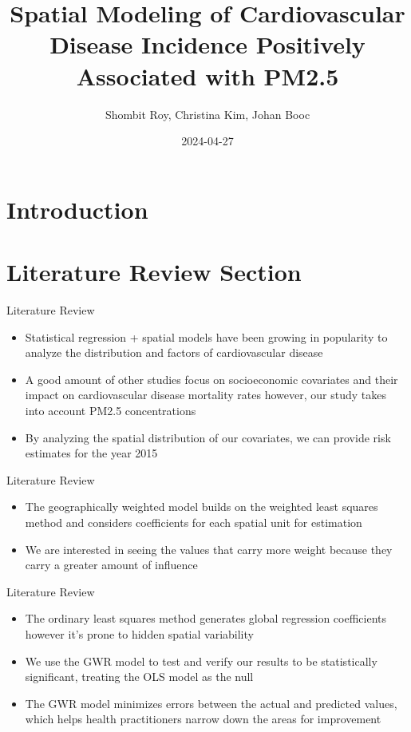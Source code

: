 \documentclass[
  ignorenonframetext,
]{beamer}
\title{Spatial Modeling of Cardiovascular Disease Incidence Positively
Associated with PM2.5}
\author{Shombit Roy, Christina Kim, Johan Booc}
\date{2024-04-27}
\begin{document}
\frame{\titlepage}

\section{Introduction}\label{introduction}

\section{Literature Review Section}\label{literature-review-section}

\begin{frame}{Literature Review}
\label{literature-review}
\begin{itemize}
\item
  Statistical regression + spatial models have been growing in
  popularity to analyze the distribution and factors of cardiovascular
  disease~
\item
  A good amount of other studies focus on socioeconomic covariates and
  their impact on cardiovascular disease mortality rates however, our
  study takes into account PM2.5 concentrations~
\item
  By analyzing the spatial distribution of our covariates, we can
  provide risk estimates for the year 2015
\end{itemize}
\end{frame}

\begin{frame}{Literature Review}
\label{literature-review-1}
\begin{itemize}
\item
  The geographically weighted model builds on the weighted least squares
  method and considers coefficients for each spatial unit for
  estimation~
\item
  We are interested in seeing the values that carry more weight because
  they carry a greater amount of influence
\end{itemize}
\end{frame}

\begin{frame}{Literature Review}
\label{literature-review-2}
\begin{itemize}
\item
  The ordinary least squares method generates global regression
  coefficients however it's prone to hidden spatial variability~
\item
  We use the GWR model to test and verify our results to be
  statistically significant, treating the OLS model as the null~
\item
  The GWR model minimizes errors between the actual and predicted
  values, which helps health practitioners narrow down the areas for
  improvement
\end{itemize}
\end{frame}
\end{document}
